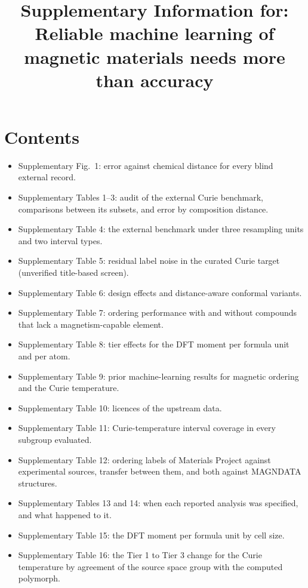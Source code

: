 \documentclass[pdflatex,sn-nature]{sn-jnl}
\begin{document}
\title[Supplementary Information]{Supplementary Information for: Reliable machine learning of magnetic materials needs more than accuracy}

\maketitle

\section{Contents}

\begin{itemize}
\item Supplementary Fig.~1: error against chemical distance for every blind external record.
\item Supplementary Tables 1--3: audit of the external Curie benchmark, comparisons between its subsets, and error by composition distance.
\item Supplementary Table 4: the external benchmark under three resampling units and two interval types.
\item Supplementary Table 5: residual label noise in the curated Curie target (unverified title-based screen).
\item Supplementary Table 6: design effects and distance-aware conformal variants.
\item Supplementary Table 7: ordering performance with and without compounds that lack a magnetism-capable element.
\item Supplementary Table 8: tier effects for the DFT moment per formula unit and per atom.
\item Supplementary Table 9: prior machine-learning results for magnetic ordering and the Curie temperature.
\item Supplementary Table 10: licences of the upstream data.
\item Supplementary Table 11: Curie-temperature interval coverage in every subgroup evaluated.
\item Supplementary Table 12: ordering labels of Materials Project against experimental sources, transfer between them, and both against MAGNDATA structures.
\item Supplementary Tables 13 and 14: when each reported analysis was specified, and what happened to it.
\item Supplementary Table 15: the DFT moment per formula unit by cell size.
\item Supplementary Table 16: the Tier 1 to Tier 3 change for the Curie temperature by agreement of the source space group with the computed polymorph.

\end{itemize}
\end{document}

